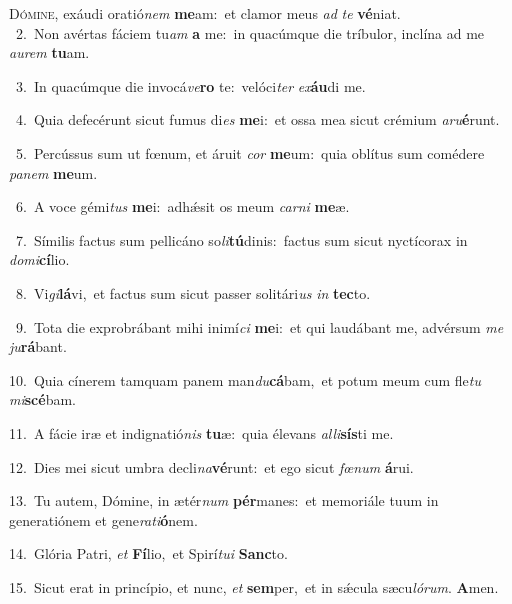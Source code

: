\lettrine{\initial\textcolor{\initialcolor}{D}}{ómine,} exáudi oratió\textit{nem} \textbf{me}\-am:~\star et clamor meus \textit{ad} \textit{te} \textbf{vé}\-niat.\\
{\numbfont\textcolor{\numbcolor}{~2.}}~Non avértas fáciem tu\textit{am} \textbf{a} me:~\star in quacúmque die tríbulor, inclína ad me \textit{au}\-\textit{rem} \textbf{tu}\-am.\par
{\numbfont\textcolor{\numbcolor}{~3.}}~In quacúmque die invocá\-\textit{ve}\-\textbf{ro} te:~\star velóci\textit{ter} \textit{ex}\-\textbf{áu}di me.\par
{\numbfont\textcolor{\numbcolor}{~4.}}~Quia defecérunt sicut fumus di\textit{es} \textbf{me}\-i:~\star et ossa mea sicut crémium \textit{a}\-\textit{ru}\textbf{é}runt.\par
{\numbfont\textcolor{\numbcolor}{~5.}}~Percússus sum ut fœnum, et áruit \textit{cor} \textbf{me}\-um:~\star quia oblítus sum comédere \textit{pa}\-\textit{nem} \textbf{me}\-um.\par
{\numbfont\textcolor{\numbcolor}{~6.}}~A voce gémi\textit{tus} \textbf{me}\-i:~\star adhǽsit os meum \textit{car}\-\textit{ni} \textbf{me}\-æ.\par
{\numbfont\textcolor{\numbcolor}{~7.}}~Símilis factus sum pellicáno so\-\textit{li}\-\textbf{tú}dinis:~\star factus sum sicut nyctícorax in \textit{do}\-\textit{mi}\textbf{cí}lio.\par
{\numbfont\textcolor{\numbcolor}{~8.}}~Vi\-\textit{gi}\-\textbf{lá}vi,~\star et factus sum sicut passer solitári\textit{us} \textit{in} \textbf{tec}\-to.\par
{\numbfont\textcolor{\numbcolor}{~9.}}~Tota die exprobrábant mihi inimí\textit{ci} \textbf{me}\-i:~\star et qui laudábant me, advérsum \textit{me} \textit{ju}\-\textbf{rá}bant.\par
{\numbfont\textcolor{\numbcolor}{10.}}~Quia cínerem tamquam panem man\-\textit{du}\-\textbf{cá}bam,~\star et potum meum cum fle\textit{tu} \textit{mi}\-\textbf{scé}bam.\par
{\numbfont\textcolor{\numbcolor}{11.}}~A fácie iræ et indignatió\textit{nis} \textbf{tu}\-æ:~\star quia élevans \textit{al}\-\textit{li}\textbf{sís}ti me.\par
{\numbfont\textcolor{\numbcolor}{12.}}~Dies mei sicut umbra decli\-\textit{na}\-\textbf{vé}runt:~\star et ego sicut \textit{fœ}\-\textit{num} \textbf{á}\-rui.\par
{\numbfont\textcolor{\numbcolor}{13.}}~Tu autem, Dómine, in ætér\textit{num} \textbf{pér}\-manes:~\star et memoriále tuum in generatiónem et gene\-\textit{ra}\-\textit{ti}\textbf{ó}nem.\par
{\numbfont\textcolor{\numbcolor}{14.}}~Glória Patri, \textit{et} \textbf{Fí}\-lio,~\star et Spirí\-\textit{tu}\-\textit{i} \textbf{Sanc}\-to.\par
{\numbfont\textcolor{\numbcolor}{15.}}~Sicut erat in princípio, et nunc, \textit{et} \textbf{sem}\-per,~\star et in sǽcula sæcu\-\textit{ló}\-\textit{rum}. \textbf{A}\-men.\par
